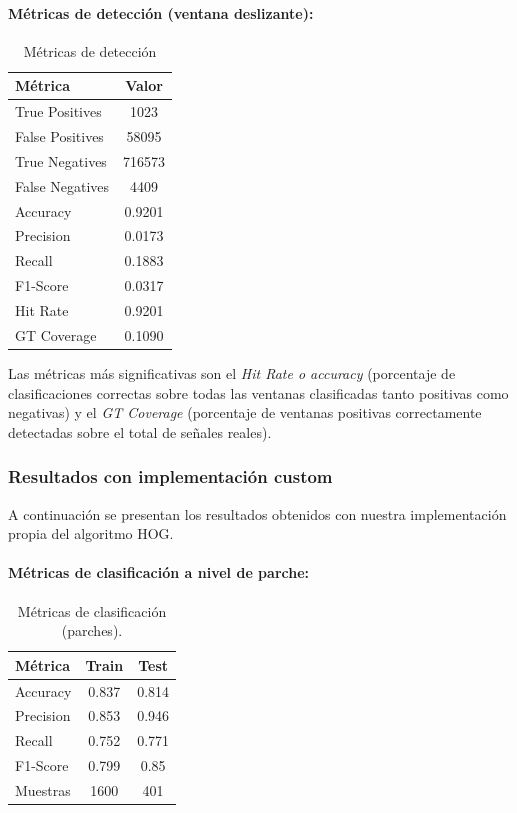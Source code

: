 \documentclass[11pt,a4paper]{article}
\begin{document}
\paragraph{Métricas de detección (ventana deslizante):}
\begin{table}[H]
    \centering
    \caption{Métricas de detección}
    \label{tab:hog_skimage_detection}
    \begin{tabular}{lc}
        \toprule
        \textbf{Métrica} & \textbf{Valor} \\
        \midrule
        True Positives & 1023 \\
        False Positives & 58095 \\
        True Negatives & 716573 \\
        False Negatives & 4409 \\
        Accuracy & 0.9201 \\
        Precision & 0.0173 \\
        Recall & 0.1883\\
        F1-Score & 0.0317\\
        Hit Rate & 0.9201\\
        GT Coverage & 0.1090\\
        \bottomrule
    \end{tabular}
\end{table}

Las métricas más significativas son el \textit{Hit Rate o accuracy} (porcentaje de clasificaciones
correctas sobre todas las ventanas clasificadas tanto positivas como negativas) y el \textit{GT Coverage}
(porcentaje de ventanas positivas correctamente detectadas sobre el total de señales reales).

\subsubsection{Resultados con implementación custom}

A continuación se presentan los resultados obtenidos con nuestra implementación 
propia del algoritmo HOG.

\paragraph{Métricas de clasificación a nivel de parche:}
\begin{table}[H]
    \centering
    \caption{Métricas de clasificación (parches).}
    \label{tab:hog_custom_patch}
    \begin{tabular}{lcc}
        \toprule
        \textbf{Métrica} & \textbf{Train} & \textbf{Test} \\
        \midrule
        Accuracy & 0.837 & 0.814\\
        Precision & 0.853 & 0.946\\
        Recall & 0.752 & 0.771\\
        F1-Score & 0.799 & 0.85\\
        Muestras & 1600 & 401 \\
        \bottomrule
    \end{tabular}
\end{table}
\end{document}
